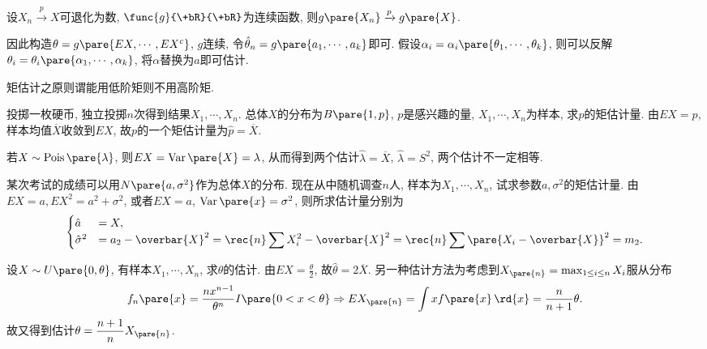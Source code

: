 \documentclass{ctexart}
\DeclareMathOperator{\Var}{Var}
\DeclareMathOperator{\Poisson}{Pois}
\begin{document}
\begin{proposition}
    设$X_n \xrightarrow{p} X$可退化为数, $\func{g}{\+bR}{\+bR}$为连续函数, 则$g\pare{X_n}\xrightarrow{p}g\pare{X}$.
\end{proposition}
因此构造$\theta = g\pare{EX,\cdots,EX^c}$, $g$连续, 令$\hat\theta_n = g\pare{a_1,\cdots,a_k}$即可. 假设$\alpha_i = \alpha_i\pare{\theta_1,\cdots,\theta_k}$, 则可以反解$\theta_i = \theta_i \pare{\alpha_1,\cdots,\alpha_k}$, 将$\alpha$替换为$a$即可估计.
\par
矩估计之原则谓能用低阶矩则不用高阶矩.
\begin{sample}
    \begin{ex}
        投掷一枚硬币, 独立投掷$n$次得到结果$X_1,\cdots,X_n$. 总体$X$的分布为$B\pare{1,p}$, $p$是感兴趣的量, $X_1,\cdots,X_n$为样本, 求$p$的矩估计量. 由$EX = p$, 样本均值$\overbar{X}$收敛到$EX$, 故$p$的一个矩估计量为$\hat p = \overbar{X}$.
    \end{ex}
\end{sample}
\begin{ex}
    若$X\sim \Poisson\pare{\lambda}$, 则$EX = \Var\pare{X} = \lambda$, 从而得到两个估计$\hat\lambda = \overbar{X}$, $\hat\lambda = S^2$, 两个估计不一定相等.
\end{ex}
\begin{sample}
    \begin{ex}
        某次考试的成绩可以用$N\pare{a,\sigma^2}$作为总体$X$的分布. 现在从中随机调查$n$人, 样本为$X_1,\cdots,X_n$, 试求参数$a,\sigma^2$的矩估计量. 由$EX = a, EX^2 = a^2 + \sigma^2$, 或者$EX = a$, $\Var\pare{x} = \sigma^2$, 则所求估计量分别为
        \[ \begin{cases}
            \hat{a} &= X, \\
            \hat{\sigma}^2 &= a_2 - \overbar{X}^2 = \displaystyle \rec{n}\sum X_i^2 - \overbar{X}^2 = \rec{n} \sum\pare{X_i - \overbar{X}}^2 = m_2.
        \end{cases} \]
    \end{ex}
\end{sample}
\begin{sample}
    \begin{ex}
        设$X\sim U\pare{0,\theta}$, 有样本$X_1,\cdots,X_n$, 求$\theta$的估计. 由$\displaystyle EX = \frac{\theta}{2}$, 故$\hat\theta = 2\overbar{X}$. 另一种估计方法为考虑到$X_{\pare{n}} = \max_{1\le i \le n} X_i$服从分布
        \[ f_n\pare{x} = \frac{nx^{n-1}}{\theta^n} I\pare{0<x<\theta}\Rightarrow EX_{\pare{n}} = \int xf\pare{x}\,\rd{x} = \frac{n}{n+1}\theta. \]
        故又得到估计$\displaystyle \theta = \frac{n+1}{n} X_{\pare{n}}$.
    \end{ex}
\end{sample}
\end{document}
